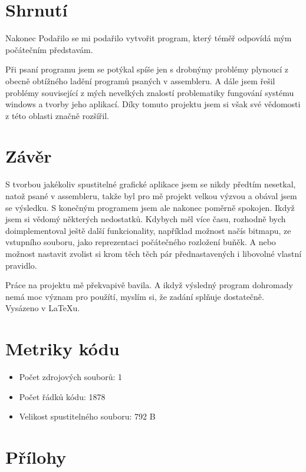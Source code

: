 \documentclass[11pt,a4paper,titlepage]{article}
\begin{document}
\newpage
\section{Shrnutí}
Nakonec Podařilo se mi podařilo vytvořit program, který téměř odpovídá mým počátečním představám.

Při psaní programu jsem se potýkal spíše jen s drobnýmy problémy plynoucí z obecně obtížného ladění programů psaných v assembleru.
A dále jsem řešil problémy související z mých nevelkých znalostí problematiky fungování systému windows a tvorby jeho aplikací. Díky tomuto projektu jsem si však své vědomosti z této oblasti značně rozšířil.


\section{Závěr}
S tvorbou jakékoliv spustitelné grafické aplikace jsem se nikdy předtím nesetkal, natož psané v assembleru, takže byl pro mě projekt velkou výzvou a obával jsem se výsledku. S konečným programem jsem ale nakonec poměrně spokojen. Ikdyž jsem si vědomý některých nedostatků. Kdybych měl více času, rozhodně bych doimplementoval ještě další funkcionality, například možnost načís bitmapu, ze vstupního souboru, jako reprezentaci počátečného rozložení buňěk. A nebo možnost nastavit zvolist si krom těch těch pár přednastavených i libovolné vlastní pravidlo.

Práce na projektu mě překvapivě bavila. A ikdyž výsledný program dohromady nemá moc význam pro použítí, myslím si, že zadání splňuje dostatečně.\\


Vysázeno v \LaTeX u.

\newpage
\section{Metriky kódu}
\begin{itemize}
  \item Počet zdrojových souborů: 1
  \item Počet řádků kódu: 1878
  \item Velikost spustitelného souboru: 792 B
\end{itemize}


\appendix
\section{Přílohy}
\begin{figure}[ht!]
\centering

\end{figure}
\end{document}
